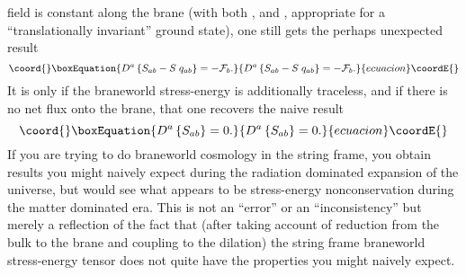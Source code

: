 \documentclass[a4paper,10pt]{article}
\begin{document}
{field is constant along the brane (with both \coordHE{}, and
\coordHE{}, appropriate for a ``translationally
invariant'' ground state), one still gets the perhaps unexpected
result
%
\begin{equation}\coord{}\boxEquation{
D^a \left\{ 
S_{ab} - S\; q_{ab}
\right\} = - \F_b.
}{
D^a \left\{ 
S_{ab} - S\; q_{ab}
\right\} = - \F_b.
}{ecuacion}\coordE{}\end{equation}
%
It is only if the braneworld stress-energy is additionally traceless,
and if there is no net flux onto the brane, that one recovers the
naive result
%
\begin{equation}\coord{}\boxEquation{
D^a \left\{ 
S_{ab}
\right\} = 0.
}{
D^a \left\{ 
S_{ab}
\right\} = 0.
}{ecuacion}\coordE{}\end{equation}
%
If you are trying to do braneworld cosmology in the string frame, you
obtain results you might naively expect during the radiation dominated
expansion of the universe, but would see what appears to be
stress-energy nonconservation during the matter dominated era. This is
not an ``error'' or an ``inconsistency'' but merely a reflection of
the fact that (after taking account of reduction from the bulk to the
brane and coupling to the dilation) the string frame braneworld
stress-energy tensor does not quite have the properties you might
naively expect.

}
\end{document}
